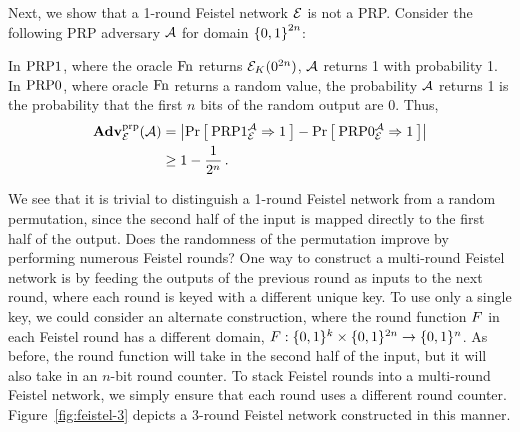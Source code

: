 \begin{example}
  Next, we show that a 1-round Feistel network $\cipher$ is not a PRP.
  Consider the following PRP adversary $\advA$ for domain $\braces*{0,1}^{2n}$:
  \begin{center}
  \end{center}

  In $\PRP1$, where the oracle $\Fn$ returns $\cipher_{\prfkey}(0^{2n})$, $\advA$ returns 1 with probability 1.
  In $\PRP0$, where oracle $\Fn$ returns a random value, the probability $\advA$ returns 1 is the probability that the first $n$ bits of the random output are 0.
  Thus,
\begin{align*}
\AdvPRP{\cipher}{\advA} &= \absv*{\Prob{\PRP1_\cipher^\advA\Rightarrow 1} - \Prob{\PRP0_\cipher^\advA\Rightarrow1} }\\
&\geq 1 - \frac{1}{2^n}\,.   
\end{align*}
\end{example}
We see that it is trivial to distinguish a 1-round Feistel network from a random permutation, since the second half of the input is mapped directly to the first half of the output.
Does the randomness of the permutation improve by performing numerous Feistel rounds?
One way to construct a multi-round Feistel network is by feeding the outputs of the previous round as inputs to the next round, where each round is keyed with a different unique key.
To use only a single key, we could consider an alternate construction, where the round function $\prf$ in each Feistel round has a different domain, $\prf:\braces{0,1}^{k}\times\braces{0,1}^{2n}\rightarrow\braces{0,1}^n$.
As before, the round function will take in the second half of the input, but it will also take in an $n$-bit round counter.
To stack Feistel rounds into a multi-round Feistel network, we simply ensure that each round uses a different round counter.
Figure~\ref{fig:feistel-3} depicts a 3-round Feistel network constructed in this manner.

